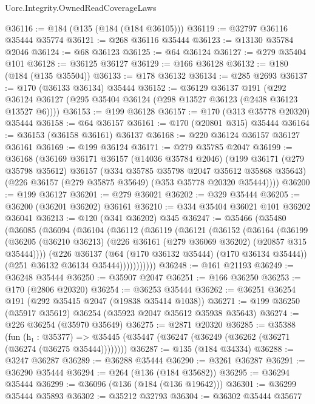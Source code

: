 \begin{lexlean}{Uorc.Integrity.OwnedReadCoverageLaws}
\begin{coremodule}
@36116 := @184 (@135 (@184 (@184 @36105)))
@36119 := @32797 @36116 @35444 @35774
@36121 := @268 @36116 @35444
@36123 := @13130 @35784 @2046
@36124 := @68 @36123
@36125 := @64 @36124
@36127 := @279 @35404 @101
@36128 := @36125 @36127
@36129 := @166 @36128
@36132 := @180 (@184 (@135 @35504))
@36133 := @178 @36132
@36134 := @285 @2693
@36137 := @170 (@36133 @36134) @35444
@36152 := @36129
    @36137
    @191
    (@292 @36124 @36127 (@295 @35404 @36124 (@298 @13527 @36123 (@2438 @36123 @13527 @6))))
@36153 := @199 @36128
@36157 := @170 (@313 @35778 @20320) @35444
@36158 := @64 @36157
@36161 := @170 (@20801 @315) @35444
@36164 := @36153 (@36158 @36161) @36137
@36168 := @220 @36124 @36157 @36127 @36161
@36169 := @199 @36124
@36171 := @279 @35785 @2047
@36199 := @36168
    (@36169
      @36171
      @36157
      (@14036 @35784 @2046)
      (@199
        @36171
        (@279 @35798 @35612)
        @36157
        (@334 @35785 @35798 @2047 @35612 @35868 @35643)
        (@226 @36157 (@279 @35875 @35649) (@353 @35778 @20320 @35444))))
@36200 := @199 @36127
@36201 := @279 @36021
@36202 := @329 @35444
@36205 := @36200 (@36201 @36202) @36161
@36210 := @334 @35404 @36021 @101 @36202 @36041
@36213 := @120 (@341 @36202) @345
@36247 := @35466
    (@35480
      (@36085
        (@36094
          (@36104
            (@36112
              (@36119
                (@36121
                  (@36152
                    (@36164
                      (@36199
                        (@36205
                          (@36210 @36213)
                          (@226 @36161 (@279 @36069 @36202) (@20857 @315 @35444))))
                      (@226
                        @36137
                        (@64 (@170 @36132 @35444) (@170 @36134 @35444))
                        (@251 @36132 @36134 @35444)))))))))))
@36248 := @161 @21193
@36249 := @36248 @35444
@36250 := @35907 @2047
@36251 := @166 @36250
@36253 := @170 (@2806 @20320)
@36254 := @36253 @35444
@36262 := @36251 @36254 @191 (@292 @35415 @2047 (@19838 @35414 @1038))
@36271 := @199 @36250 (@35917 @35612) @36254 (@35923 @2047 @35612 @35938 @35643)
@36274 := @226 @36254 (@35970 @35649)
@36275 := @2871 @20320
@36285 := @35388
    (fun (h₁ : @35377) =>
    @35445 (@35447 (@36247 (@36249 (@36262 (@36271 (@36274 (@36275 @35444))))))))
@36287 := @135 (@184 @34334)
@36288 := @3247 @36287
@36289 := @36288 @35444
@36290 := @3261 @36287
@36291 := @36290 @35444
@36294 := @264 (@136 (@184 @35682))
@36295 := @36294 @35444
@36299 := @36096 (@136 (@184 (@136 @19642)))
@36301 := @36299 @35444 @35893
@36302 := @35212 @32793
@36304 := @36302 @35444 @35677

\end{coremodule}
\end{lexlean}
